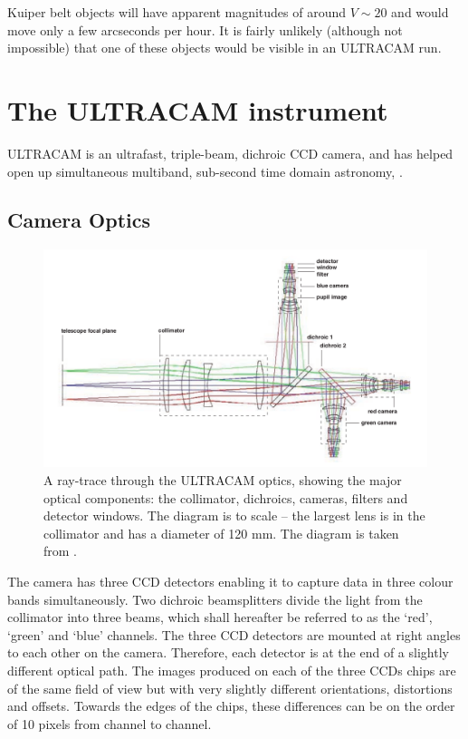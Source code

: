 Kuiper belt objects will have apparent magnitudes of around $V\sim 20$ and would move only a few arcseconds per hour. It is fairly unlikely (although not impossible) that one of these objects would be visible in an ULTRACAM run. 

\section{The ULTRACAM instrument} 
ULTRACAM is an ultrafast, triple-beam, dichroic CCD camera, and has helped open up simultaneous multiband, sub-second time domain astronomy, \citep{dhillon07}. 

\subsection{Camera Optics}

\begin{figure}
\centering
\includegraphics[width=120mm]{images/ucamoptics.png}
\caption{A ray-trace through the ULTRACAM optics, showing the major optical components: the collimator, dichroics, cameras, filters and detector windows. The diagram is to scale – the largest lens is in the collimator and has a diameter of 120 mm. The diagram is taken from \citet{dhillon07}.}
\label{fig:optics}
\end{figure}

The camera has three CCD detectors enabling it to capture data in three colour bands simultaneously. Two dichroic beamsplitters divide the light from the collimator into three beams, which shall hereafter be referred to as the `red', `green' and `blue' channels. The three CCD detectors are mounted at right angles to each other on the camera. Therefore, each detector is at the end of a slightly different optical path. The images produced on each of the three CCDs chips are of the same field of view but with very slightly different orientations, distortions and offsets. Towards the edges of the chips, these differences can be on the order of 10 pixels from channel to channel. 


